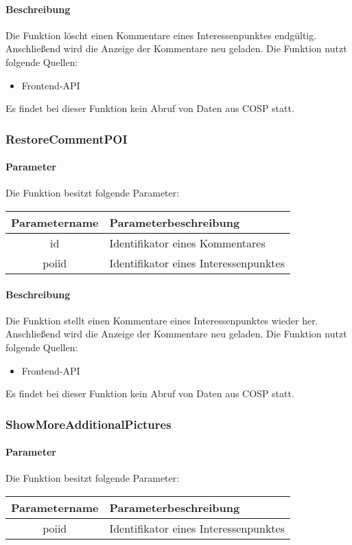 \paragraph{Beschreibung} Die Funktion löscht einen Kommentare eines Interessenpunktes endgültig. Anschließend wird die Anzeige der Kommentare neu geladen. Die Funktion nutzt folgende Quellen:
\begin{itemize}
	\item Frontend-API
\end{itemize}
Es findet bei dieser Funktion kein Abruf von Daten aus {\glqq COSP\grqq} statt.
\subsubsection{RestoreCommentPOI}
\paragraph{Parameter} Die Funktion besitzt folgende Parameter:
\begin{table}[H]
	\begin{tabular}{|c|p{11cm}|}
		\hline
		\textbf{Parametername} & \textbf{Parameterbeschreibung} \\ \hline
		id    & Identifikator eines Kommentares \\ \hline
		poiid & Identifikator eines Interessenpunktes \\ \hline
	\end{tabular}
\end{table}
\paragraph{Beschreibung} Die Funktion stellt einen Kommentare eines Interessenpunktes wieder her. Anschließend wird die Anzeige der Kommentare neu geladen. Die Funktion nutzt folgende Quellen:
\begin{itemize}
	\item Frontend-API
\end{itemize}
Es findet bei dieser Funktion kein Abruf von Daten aus {\glqq COSP\grqq} statt.
\subsubsection{ShowMoreAdditionalPictures}
\paragraph{Parameter} Die Funktion besitzt folgende Parameter:
\begin{table}[H]
	\begin{tabular}{|c|p{11cm}|}
		\hline
		\textbf{Parametername} & \textbf{Parameterbeschreibung} \\ \hline
		poiid & Identifikator eines Interessenpunktes \\ \hline
	\end{tabular}
\end{table}
